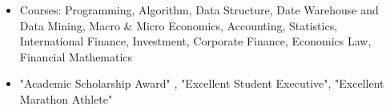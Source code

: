 \documentclass[a4paper,12pt]{report}
\begin{document}
\noindent 
\begin{itemize}[noitemsep,topsep=0pt]
\item {\fontsize{10pt}{10pt}\selectfont Courses: Programming, Algorithm, Data Structure, Date Warehouse and Data Mining, Macro  $  \&  $ Micro Economics, Accounting, Statistics, International Finance, Investment, Corporate Finance, Economics Law, Financial Mathematics} \par
\noindent 
\item {\fontsize{10pt}{10pt}\selectfont "Academic Scholarship Award" , "Excellent Student Executive", "Excellent Marathon Athlete"}\end{itemize}
 \par
 \vspace{9pt}
 
 
 
\end{document}
